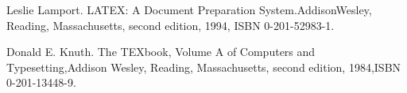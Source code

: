 
\setlength{\baselineskip}{18pt}
\songti\xiaosi
\begin{thebibliography}{99}
	
Leslie Lamport. LATEX: A Document Preparation System.AddisonWesley, Reading, Massachusetts, second edition, 1994, ISBN 0-201-52983-1.

Donald E. Knuth. The TEXbook, Volume A of Computers and Typesetting,Addison Wesley, Reading, Massachusetts, second edition, 1984,ISBN 0-201-13448-9.
\end{thebibliography}





